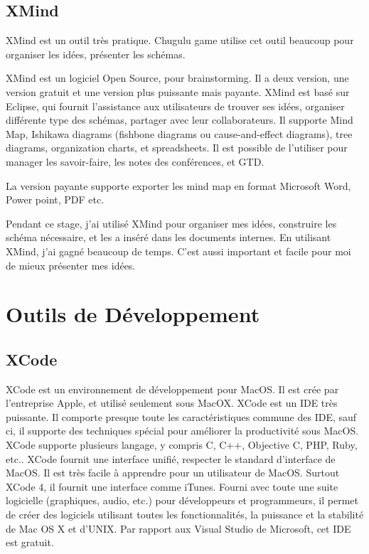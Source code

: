 
\subsection{XMind} %


XMind est un outil très pratique. Chugulu game utilise cet outil beaucoup pour organiser les idées, présenter les schémas. 

XMind est un logiciel Open Source, pour brainstorming. Il a deux version, une version gratuit et une version plus puissante mais payante. XMind est basé sur Eclipse, qui fournit l'assistance aux utilisateurs de trouver ses idées, organiser différente type des schémas, partager avec leur collaborateurs. Il supporte Mind Map, Ishikawa diagrams (fishbone diagrams ou cause-and-effect diagrams), tree diagrams, organization charts, et spreadsheets. Il est possible de l'utiliser pour manager les savoir-faire, les notes des conférences, et GTD. 

La version payante supporte exporter les mind map en format Microsoft Word, Power point, PDF etc.

Pendant ce stage, j'ai utilisé XMind pour organiser mes idées, construire les schéma nécessaire, et les a inséré dans les documents internes. En utilisant XMind, j'ai gagné beaucoup de temps. C'est aussi important et facile pour moi de mieux présenter mes idées.


\section{Outils de Développement} %
\label{sec:outils_de_développement}

\subsection{XCode} %
\label{sub:xcode}


XCode est un environnement de développement pour MacOS. Il est crée par l'entreprise Apple, et utilisé seulement sous MacOX. XCode est un IDE très puissante. Il comporte presque toute les caractéristiques commune des IDE, sauf ci, il supporte des techniques spécial pour améliorer la productivité sous MacOS. XCode supporte plusieurs langage, y compris C, C++, Objective C, PHP, Ruby, etc.. XCode fournit une interface unifié, respecter le standard d'interface de MacOS. Il est très facile à apprendre pour un utilisateur de MacOS. Surtout XCode 4, il fournit une interface comme iTunes. Fourni avec toute une suite logicielle (graphiques, audio, etc.) pour développeurs et programmeurs, il permet de créer des logiciels utilisant toutes les fonctionnalités, la puissance et la stabilité de Mac OS X et d'UNIX. Par rapport aux Visual Studio de Microsoft, cet IDE est gratuit.


